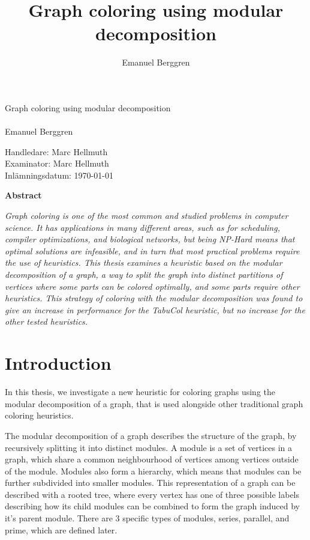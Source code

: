 \documentclass[a4paper]{article}
\author{Emanuel Berggren}
\title{Graph coloring using modular decomposition}
\newcommand{\Framsida}{\AddToShipoutPicture*{\put(0,0){\texttt{[image: kandidatfram.pdf]}}}}
\begin{document}
\Framsida 
\vspace*{4cm}
\Huge{Graph coloring using modular decomposition}\\\\ %
\Large{Emanuel Berggren} %

\vspace*{12cm}
\Large{Handledare: Marc Hellmuth} \\ 
\Large{Examinator: Marc Hellmuth} \\ 
\Large{Inlämningsdatum: \today}\\

\begin{center}
	\textbf{Abstract}
\end{center}
\textit{
Graph coloring is one of the most common and studied problems in computer
science. It has applications in many different areas, such as for scheduling,
compiler optimizations, and biological networks, but
being NP-Hard means that optimal solutions are infeasible, and in turn that most
practical problems require the use of heuristics. This thesis examines a
heuristic based on the modular decomposition of a graph, a way to split the graph
into distinct partitions of vertices where some parts can be colored optimally,
and some parts require other heuristics. This strategy of coloring with the
modular decomposition was found to give an increase in performance for the
TabuCol heuristic, but no increase for the other tested heuristics.
}




\tableofcontents

\section{Introduction}


In this thesis, we investigate a new heuristic for coloring graphs using the
modular decomposition of a graph, that is used alongside other traditional
graph coloring heuristics.

The modular decomposition of a graph describes the structure of the graph, by
recursively splitting it into distinct modules. A module is a set of vertices
in a graph, which share a common neighbourhood of vertices among vertices
outside of the module. Modules also form a hierarchy, which means that modules
can be further subdivided into smaller modules. This representation of a graph
can be described with a rooted tree, where every vertex has one of three
possible labels describing how its child modules can be combined to form the
graph induced by it's parent module. There are 3 specific types of modules,
series, parallel, and prime, which are defined later.
\end{document}

